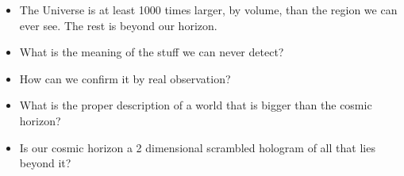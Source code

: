 \documentclass[]{article}
\begin{document}
\begin{itemize}
	\item The Universe is at least 1000 times larger, by volume, than the region we can ever see. The rest is beyond our horizon.
	\item What is the meaning of the stuff we can never detect?
	\item How can we confirm it by real observation?
	\item What is the proper description of a world that is bigger than the cosmic horizon?
	\item Is our cosmic horizon a 2 dimensional scrambled hologram of all that lies beyond it? 
\end{itemize}


\raggedright

\end{document}
